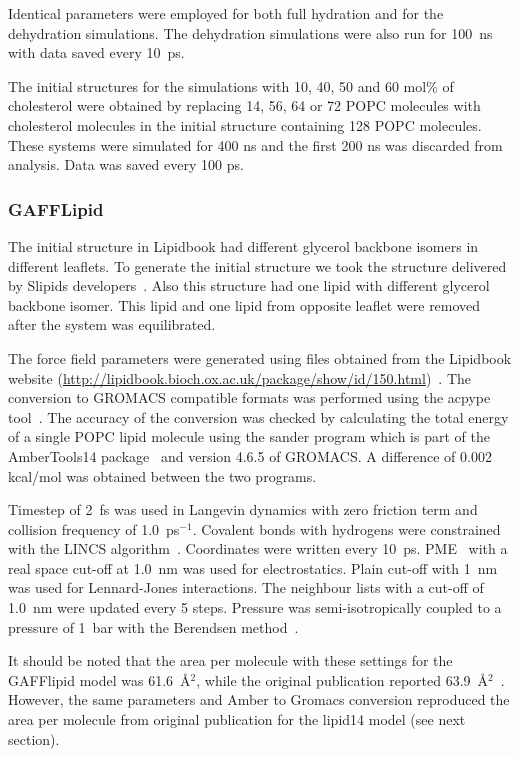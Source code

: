 \documentclass[journal=jacsat,manuscript=article]{achemso}
\begin{document}
Identical parameters were employed for both full hydration and for the dehydration simulations. The dehydration simulations were also run for 100~ns 
with data saved every 10~ps.

The initial structures for the simulations with 10, 40, 50 and 60 mol\% of cholesterol were obtained by replacing 14, 56, 64 or 72 POPC molecules 
with cholesterol molecules in the initial structure containing 128 POPC molecules. These systems were simulated for 400 ns and the first 200 ns was 
discarded from analysis. Data was saved every 100 ps.



\subsubsection{GAFFLipid}
The initial structure in Lipidbook \cite{domanski10} had different glycerol backbone isomers in different leaflets. 
To generate the initial structure we took the structure delivered by Slipids developers~\cite{jambeck12b}. Also this structure
had one lipid with different glycerol backbone isomer. This lipid and one lipid from opposite leaflet were removed
after the system was equilibrated.

The force field parameters were generated using files obtained from the Lipidbook website (\url{http://lipidbook.bioch.ox.ac.uk/package/show/id/150.html})~\cite{domanski10}. 
The conversion to GROMACS compatible formats was performed using the acpype tool~\cite{silva12}. The accuracy of the conversion was checked by calculating 
the total energy of a single POPC lipid molecule using the sander program which is part of the AmberTools14 package~\cite{ferrer13} and version 4.6.5 of GROMACS. 
A difference of 0.002 kcal/mol was obtained between the two programs.

Timestep of 2~fs was used in Langevin dynamics with zero friction term and collision frequency of 1.0~ps$^{-1}$. 
Covalent bonds with hydrogens were constrained with the LINCS algorithm~\cite{hess97,hess07}.
Coordinates were written every 10~ps. PME~\cite{darden93,essman95} with a real space cut-off at 1.0~nm was used 
for electrostatics. Plain cut-off with 1~nm was used for Lennard-Jones interactions. 
The neighbour lists with a cut-off of 1.0~nm were updated every 5 steps. 
Pressure was semi-isotropically coupled to a pressure of 1~bar with the Berendsen method~\cite{berendsen84}.

It should be noted that the area per molecule with these settings for the GAFFlipid model was 61.6~\AA$^2$,
while the original publication reported 63.9~\AA$^2$~\cite{dickson12}. However, the same parameters and Amber to Gromacs
conversion reproduced the area per molecule from original publication for the lipid14 model (see next section).
\end{document}
